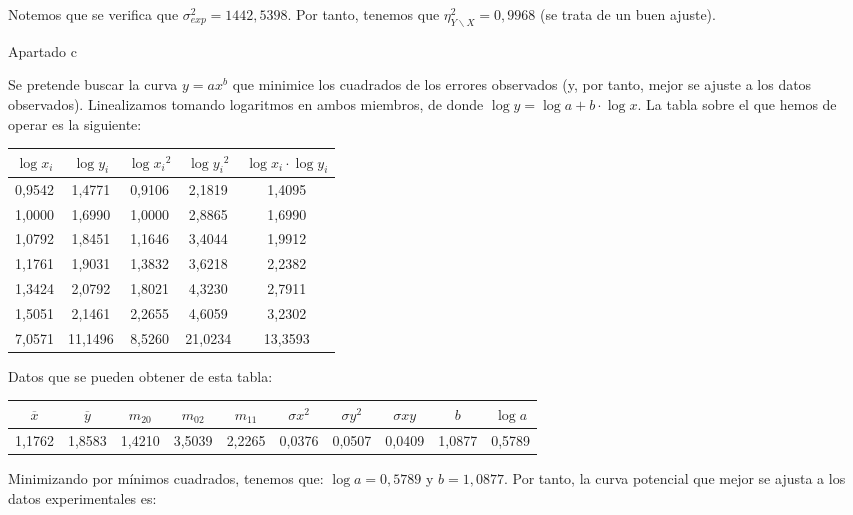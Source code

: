Notemos que se verifica que $\sigma_{exp}^2 = 1442,5398$. Por tanto, tenemos que $\eta_{Y\backslash X}^2 = 0,9968$ (se trata de un buen ajuste).

Apartado c

Se pretende buscar la curva $y =  ax^b$ que minimice los cuadrados de los errores observados (y, por tanto, mejor se ajuste a los datos observados). Linealizamos tomando logaritmos en ambos miembros, de donde $\log{y} = \log{a} + b·\log{x}$. La tabla sobre el que hemos de operar es la siguiente:

\begin{center}
	\begin{tabular}{ c|c|c c c }
	
	$\log{x_i}$ & $\log{y_i}$ & $\log{x_i}^2$ & $\log{y_i}^2$ & $\log{x_i}·\log{y_i}$ \\ \hline
	0,9542 & 1,4771 & 0,9106 & 2,1819 & 1,4095 \\ 
	1,0000 & 1,6990 & 1,0000 & 2,8865 & 1,6990 \\ 
	1,0792 & 1,8451 & 1,1646 & 3,4044 & 1,9912 \\ 
	1,1761 & 1,9031 & 1,3832 & 3,6218 & 2,2382 \\ 
	1,3424 & 2,0792 & 1,8021 & 4,3230 & 2,7911 \\ 
	1,5051 & 2,1461 & 2,2655 & 4,6059 & 3,2302 \\ \hline
	7,0571 & 11,1496 & 8,5260 & 21,0234 & 13,3593 \\ 
\end{tabular}
\end{center}

Datos que se pueden obtener de esta tabla:

\vspace{1em}

\tiny
\begin{tabular}{|c|c|c|c|c|c|c|c|c|c|}
	\hline
	$\overline{x}$ & $\overline{y}$ & $m_{20}$ & $m_{02}$ & $m_{11}$ & $\sigma{x}^2$ & $\sigma{y}^2$ & $\sigma{xy}$ &  $b$ & $\log{a}$  \\ \hline
	1,1762 & 1,8583 & 1,4210 & 3,5039 & 2,2265 & 0,0376 & 0,0507 & 0,0409 & 1,0877 & 0,5789 \\ \hline
\end{tabular}
\normalsize

\vspace{1em}

Minimizando por mínimos cuadrados, tenemos que: $\log{a} = 0,5789$ y $b=1,0877$. Por tanto, la curva potencial que mejor se ajusta a los datos experimentales es:

